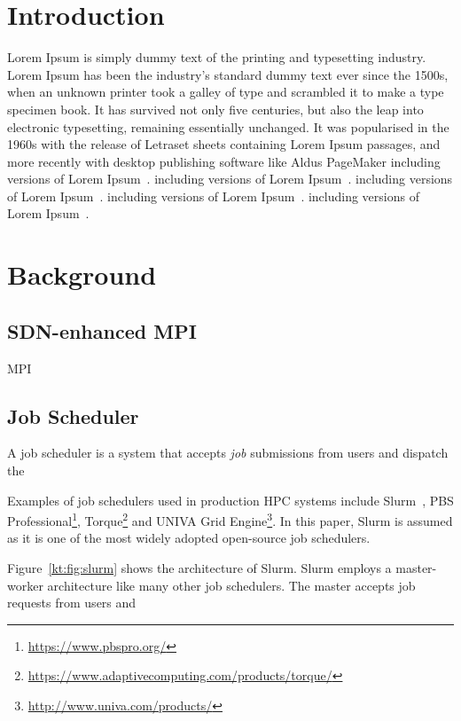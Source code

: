 \documentclass[graybox]{svmult}
\begin{document}
\section{Introduction}

Lorem Ipsum is simply dummy text of the printing and typesetting industry.
Lorem Ipsum has been the industry's standard dummy text ever since the 1500s,
when an unknown printer took a galley of type and scrambled it to make a type
specimen book. It has survived not only five centuries, but also the leap into
electronic typesetting, remaining essentially unchanged. It was popularised in
the 1960s with the release of Letraset sheets containing Lorem Ipsum passages,
and more recently with desktop publishing software like Aldus PageMaker
including versions of Lorem Ipsum~\cite{Takahashi2014}. including versions of
Lorem Ipsum~\cite{Takahashi2015}. including versions of Lorem
Ipsum~\cite{Takahashi2017}. including versions of Lorem
Ipsum~\cite{Takahashi2018}. including versions of Lorem
Ipsum~\cite{Dashdavaa2014}.


\section{Background}

\subsection{SDN-enhanced MPI}

MPI~\cite{MPIForum2012}

\subsection{Job Scheduler}

A job scheduler is a system that accepts \textit{job} submissions from users and
dispatch the

Examples of job schedulers used in production HPC systems include
Slurm~\cite{Yoo2003}, PBS
Professional\footnote{\url{https://www.pbspro.org/}},
Torque\footnote{\url{https://www.adaptivecomputing.com/products/torque/}} and
UNIVA Grid Engine\footnote{\url{http://www.univa.com/products/}}. In this
paper, Slurm is assumed as it is one of the most widely adopted open-source
job schedulers.

Figure~\ref{kt:fig:slurm} shows the architecture of Slurm. Slurm employs a
master-worker architecture like many other job schedulers. The master accepts
job requests from users and
\end{document}
